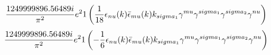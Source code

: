 \begin{dmath}\frac{1249999896.56489 i}{\pi^{2}} e^{2}1\left(\frac{1}{18} \epsilon_{ \\nu }({ k }) \bar{\epsilon}_{ \\mu }({ k }) { { k }_{ \\sigma_1 } } { \gamma^{ \\mu } } { \gamma^{ \\sigma_1 } } { \gamma^{ \\sigma_2 } } { \gamma^{ \\nu } }\right)\end{dmath}
\begin{dmath}\frac{1249999896.56489 i}{\pi^{2}} e^{2}1\left(- \frac{1}{6} \epsilon_{ \\nu }({ k }) \bar{\epsilon}_{ \\mu }({ k }) { { k }_{ \\sigma_1 } } { \gamma^{ \\mu } } { \gamma^{ \\sigma_1 } } { \gamma^{ \\sigma_2 } } { \gamma^{ \\nu } }\right)\end{dmath}
